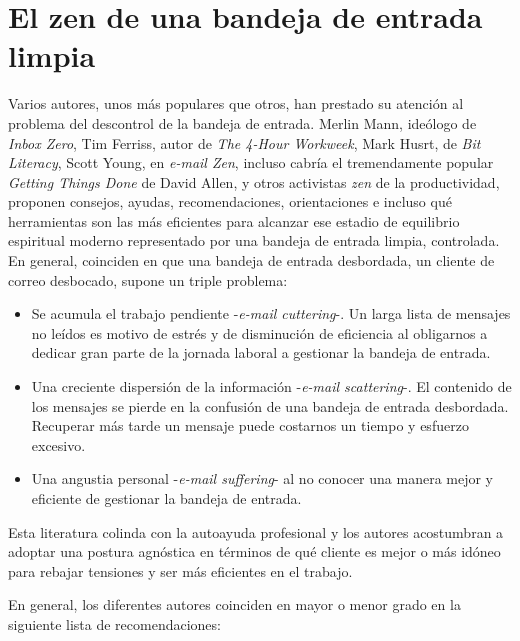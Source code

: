 \documentclass[12pt, a4paper,twoside]{book}
\begin{document}
\section{El zen de una bandeja de entrada limpia}

Varios autores, unos más populares que otros, han prestado su
atención al problema del descontrol de la bandeja de entrada.
Merlin Mann, ideólogo de \emph{Inbox Zero}, Tim Ferriss, autor de
\emph{The 4-Hour Workweek}, Mark Husrt, de \emph{Bit Literacy},
Scott Young, en \emph{e-mail Zen}, incluso cabría el tremendamente
popular \emph{Getting Things Done} de David Allen, y otros
activistas \emph{zen} de la productividad, proponen consejos,
ayudas, recomendaciones, orientaciones e incluso qué herramientas
son las más eficientes para alcanzar ese estadio de equilibrio
espiritual moderno representado por una bandeja de entrada limpia,
controlada. En general, coinciden en que una bandeja de entrada
desbordada, un cliente de correo desbocado, supone un triple
problema:

\begin{itemize}
\item
  Se acumula el trabajo pendiente -\emph{e-mail cuttering}-. Un larga
  lista de mensajes no leídos es motivo de estrés y de disminución de
  eficiencia al obligarnos a dedicar gran parte de la jornada laboral
  a gestionar la bandeja de entrada.
\item
  Una creciente dispersión de la información
  -\emph{e-mail scattering}-. El contenido de los mensajes se pierde
  en la confusión de una bandeja de entrada desbordada. Recuperar más
  tarde un mensaje puede costarnos un tiempo y esfuerzo excesivo.
\item
  Una angustia personal -\emph{e-mail suffering}- al no conocer una
  manera mejor y eficiente de gestionar la bandeja de entrada.
\end{itemize}
Esta literatura colinda con la autoayuda profesional y los autores
acostumbran a adoptar una postura agnóstica en términos de qué
cliente es mejor o más idóneo para rebajar tensiones y ser más
eficientes en el trabajo.

En general, los diferentes autores coinciden en mayor o menor grado
en la siguiente lista de recomendaciones:
\end{document}
